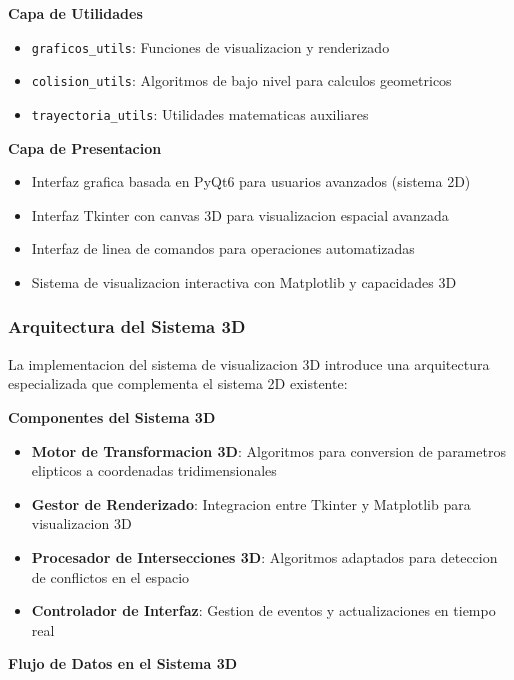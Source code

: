 \documentclass[12pt,a4paper]{article}
\begin{document}
\textbf{Capa de Utilidades}
\begin{itemize}
    \item \texttt{graficos\_utils}: Funciones de visualizacion y renderizado
    \item \texttt{colision\_utils}: Algoritmos de bajo nivel para calculos geometricos
    \item \texttt{trayectoria\_utils}: Utilidades matematicas auxiliares
\end{itemize}

\textbf{Capa de Presentacion}
\begin{itemize}
    \item Interfaz grafica basada en PyQt6 para usuarios avanzados (sistema 2D)
    \item Interfaz Tkinter con canvas 3D para visualizacion espacial avanzada
    \item Interfaz de linea de comandos para operaciones automatizadas
    \item Sistema de visualizacion interactiva con Matplotlib y capacidades 3D
\end{itemize}

\subsubsection{Arquitectura del Sistema 3D}

La implementacion del sistema de visualizacion 3D introduce una arquitectura especializada que complementa el sistema 2D existente:

\textbf{Componentes del Sistema 3D}
\begin{itemize}
    \item \textbf{Motor de Transformacion 3D}: Algoritmos para conversion de parametros elipticos a coordenadas tridimensionales
    \item \textbf{Gestor de Renderizado}: Integracion entre Tkinter y Matplotlib para visualizacion 3D
    \item \textbf{Procesador de Intersecciones 3D}: Algoritmos adaptados para deteccion de conflictos en el espacio
    \item \textbf{Controlador de Interfaz}: Gestion de eventos y actualizaciones en tiempo real
\end{itemize}

\textbf{Flujo de Datos en el Sistema 3D}
\end{document}
